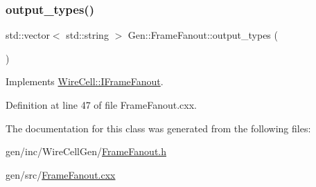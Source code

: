 \subsubsection{\texorpdfstring{output\+\_\+types()}{output\_types()}}
{\footnotesize\ttfamily std\+::vector$<$ std\+::string $>$ Gen\+::\+Frame\+Fanout\+::output\+\_\+types (\begin{DoxyParamCaption}{ }\end{DoxyParamCaption})\hspace{0.3cm}{\ttfamily [virtual]}}



Implements \hyperlink{class_wire_cell_1_1_i_frame_fanout_aa54a33e4454b6d2cced872b903641d4a}{Wire\+Cell\+::\+I\+Frame\+Fanout}.



Definition at line 47 of file Frame\+Fanout.\+cxx.



The documentation for this class was generated from the following files\+:\begin{DoxyCompactItemize}
\item 
gen/inc/\+Wire\+Cell\+Gen/\hyperlink{_frame_fanout_8h}{Frame\+Fanout.\+h}\item 
gen/src/\hyperlink{_frame_fanout_8cxx}{Frame\+Fanout.\+cxx}\end{DoxyCompactItemize}
